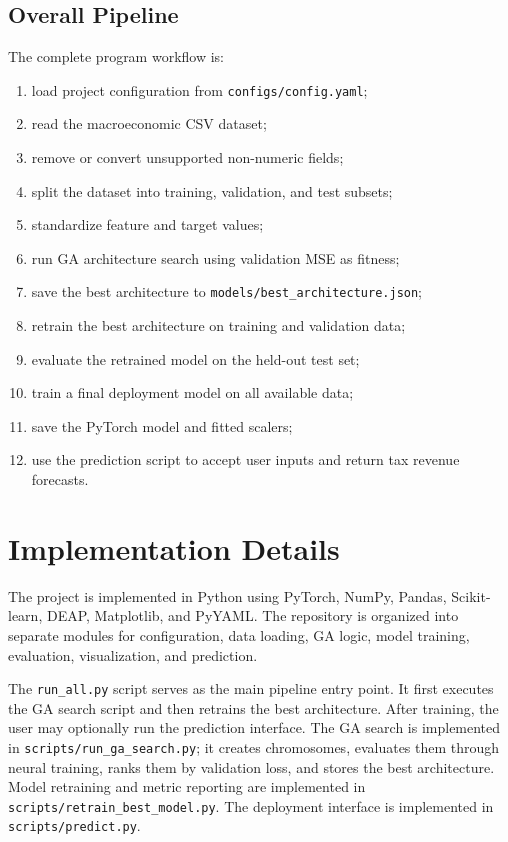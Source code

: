 \documentclass[conference]{IEEEtran}
\begin{document}
\subsection{Overall Pipeline}
The complete program workflow is:
\begin{enumerate}
    \item load project configuration from \texttt{configs/config.yaml};
    \item read the macroeconomic CSV dataset;
    \item remove or convert unsupported non-numeric fields;
    \item split the dataset into training, validation, and test subsets;
    \item standardize feature and target values;
    \item run GA architecture search using validation MSE as fitness;
    \item save the best architecture to \texttt{models/best\_architecture.json};
    \item retrain the best architecture on training and validation data;
    \item evaluate the retrained model on the held-out test set;
    \item train a final deployment model on all available data;
    \item save the PyTorch model and fitted scalers;
    \item use the prediction script to accept user inputs and return tax revenue forecasts.
\end{enumerate}

\section{Implementation Details}
The project is implemented in Python using PyTorch, NumPy, Pandas, Scikit-learn, DEAP, Matplotlib, and PyYAML. The repository is organized into separate modules for configuration, data loading, GA logic, model training, evaluation, visualization, and prediction.

The \texttt{run\_all.py} script serves as the main pipeline entry point. It first executes the GA search script and then retrains the best architecture. After training, the user may optionally run the prediction interface. The GA search is implemented in \texttt{scripts/run\_ga\_search.py}; it creates chromosomes, evaluates them through neural training, ranks them by validation loss, and stores the best architecture. Model retraining and metric reporting are implemented in \texttt{scripts/retrain\_best\_model.py}. The deployment interface is implemented in \texttt{scripts/predict.py}.
\end{document}
